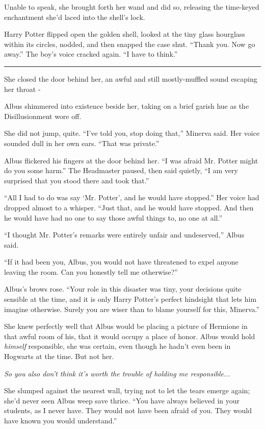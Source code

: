 Unable to speak, she brought forth her wand and did so, releasing the
time-keyed enchantment she'd laced into the shell's lock.

Harry Potter flipped open the golden shell, looked at the tiny glass
hourglass within its circles, nodded, and then snapped the case shut.
``Thank you. Now go away.'' The boy's voice cracked again. ``I have to
think.''

\begin{center}\rule{3in}{0.4pt}\end{center}

She closed the door behind her, an awful and still mostly-muffled sound
escaping her throat -

Albus shimmered into existence beside her, taking on a brief garish hue
as the Disillusionment wore off.

She did not jump, quite. ``I've told you, stop doing that,'' Minerva
said. Her voice sounded dull in her own ears. ``That was private.''

Albus flickered his fingers at the door behind her. ``I was afraid Mr.
Potter might do you some harm.'' The Headmaster paused, then said
quietly, ``I am very surprised that you stood there and took that.''

``All I had to do was say `Mr. Potter', and he would have stopped.'' Her
voice had dropped almost to a whisper. ``Just that, and he would have
stopped. And then he would have had no one to say those awful things to,
no one at all.''

``I thought Mr. Potter's remarks were entirely unfair and undeserved,''
Albus said.

``If it had been you, Albus, you would not have threatened to expel
anyone leaving the room. Can you honestly tell me otherwise?''

Albus's brows rose. ``Your role in this disaster was tiny, your
decisions quite sensible at the time, and it is only Harry Potter's
perfect hindsight that lets him imagine otherwise. Surely you are wiser
than to blame yourself for this, Minerva.''

She knew perfectly well that Albus would be placing a picture of
Hermione in that awful room of his, that it would occupy a place of
honor. Albus would hold \emph{himself} responsible, she was certain,
even though he hadn't even been in Hogwarts at the time. But not her.

\emph{So you also don't think it's worth the trouble of holding me
responsible...}

She slumped against the nearest wall, trying not to let the tears emerge
again; she'd never seen Albus weep save thrice. ``You have always
believed in your students, as I never have. They would not have been
afraid of you. They would have known you would understand.''

